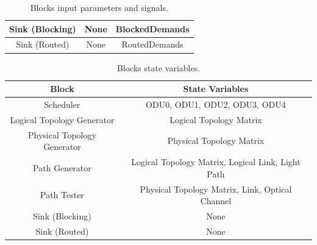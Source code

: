 \begin{table}[H]
\begin{tabular}{|c|c|c|}
		Sink (Blocking)                                                       & None                                                                                                                       & BlockedDemands                                                               \\ \hline
		Sink (Routed)                                                         & None                                                                                                                       & RoutedDemands                                                                \\ \hline
	\end{tabular}
	\caption{Blocks input parameters and signals.}
	\label{blocks_input}
\end{table}

\begin{table}[H]
	\centering
	\begin{tabular}{|c|c|}
		\hline
		\textbf{Block }                                                      & \textbf{State Variables}                                                        \\ \hline
		Scheduler                                                             & ODU0, ODU1, ODU2, ODU3, ODU4      								 \\ \hline
		Logical Topology Generator                                  & Logical Topology Matrix                                                        \\ \hline
		Physical Topology Generator								  & Physical Topology Matrix                                                      \\ \hline
		Path Generator                                                   & Logical Topology Matrix, Logical Link, Light Path                      \\ \hline
		Path Tester                                                            & Physical Topology Matrix, Link, Optical Channel					 \\ \hline
		Sink (Blocking)                                                       & None                                                                  \\ \hline
		Sink (Routed)                                                         & None                                                                   \\ \hline
	\end{tabular}
	\caption{Blocks state variables.}
	\label{blocks_state_variables_opaque}
\end{table}

